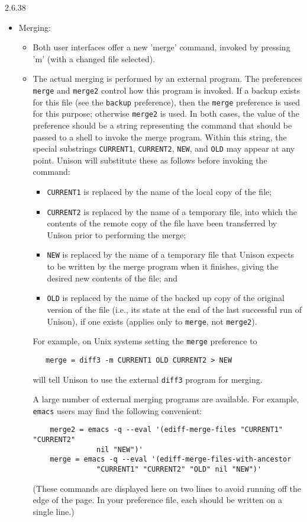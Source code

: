 \begin{changesfromversion}{2.6.38}
\begin{itemize}
\item Merging:
\begin{itemize}
  \item Both user interfaces offer a new 'merge' command, invoked by pressing
      'm' (with a changed file selected).  
  \item The actual merging is performed by an external program.  
      The preferences \verb|merge| and \verb|merge2| control how this
      program is invoked.  If a backup exists for this file (see the
      \verb|backup| preference), then the \verb|merge| preference is used for 
      this purpose; otherwise \verb|merge2| is used.  In both cases, the 
      value of the preference should be a string representing the command 
      that should be passed to a shell to invoke the 
      merge program.  Within this string, the special substrings
      \verb|CURRENT1|, \verb|CURRENT2|, \verb|NEW|,  and \verb|OLD| may appear
      at any point.  Unison will substitute these as follows before invoking
      the command:
        \begin{itemize}
        \item \relax\verb|CURRENT1| is replaced by the name of the local 
        copy of the file;
        \item \relax\verb|CURRENT2| is replaced by the name of a temporary
        file, into which the contents of the remote copy of the file have
        been transferred by Unison prior to performing the merge;
        \item \relax\verb|NEW| is replaced by the name of a temporary
        file that Unison expects to be written by the merge program when
        it finishes, giving the desired new contents of the file; and
        \item \relax\verb|OLD| is replaced by the name of the backed up
        copy of the original version of the file (i.e., its state at the 
        end of the last successful run of Unison), if one exists 
        (applies only to \verb|merge|, not \verb|merge2|).
        \end{itemize}
      For example, on Unix systems setting the \verb|merge| preference to
\begin{verbatim}
   merge = diff3 -m CURRENT1 OLD CURRENT2 > NEW
\end{verbatim}
      will tell Unison to use the external \verb|diff3| program for merging.  

      A large number of external merging programs are available.  For 
      example, \verb|emacs| users may find the following convenient:
\begin{verbatim}
    merge2 = emacs -q --eval '(ediff-merge-files "CURRENT1" "CURRENT2" 
               nil "NEW")' 
    merge = emacs -q --eval '(ediff-merge-files-with-ancestor 
               "CURRENT1" "CURRENT2" "OLD" nil "NEW")' 
\end{verbatim}
(These commands are displayed here on two lines to avoid running off the
edge of the page.  In your preference file, each should be written on a
single line.) 


\end{itemize}
\end{itemize}
\end{changesfromversion}
